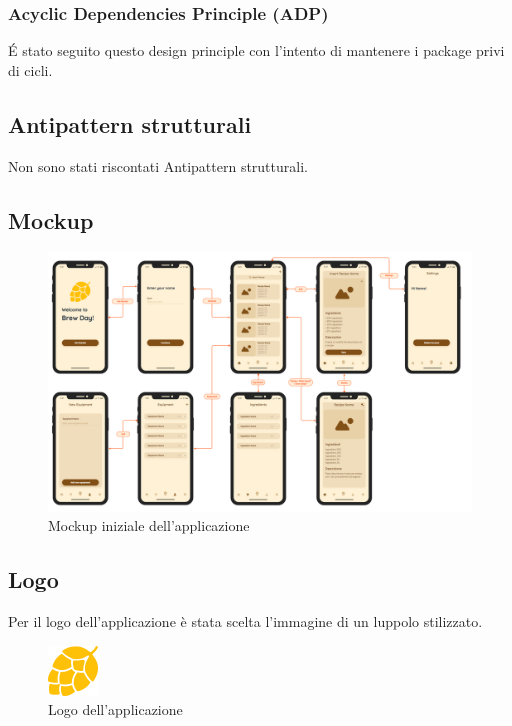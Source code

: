 \documentclass[12pt]{article}
\begin{document}
\subsubsection{Acyclic Dependencies Principle (ADP)}
É stato seguito questo design principle con l'intento di mantenere i package privi di cicli.
 

\subsection{Antipattern strutturali}
Non sono stati riscontati Antipattern strutturali.


\subsection{Mockup}
\begin{figure}[H]
\centering
\includegraphics[width=450px]{mockup.png}
\caption{\label{fig:mockup}Mockup iniziale dell'applicazione}
\end{figure}


\subsection{Logo}
Per il logo dell'applicazione è stata scelta l'immagine di un luppolo stilizzato.
\begin{figure}[H]
\centering
\includegraphics[width=50px]{logo.png}
\caption{\label{fig:logo}Logo dell'applicazione}
\end{figure}
\end{document}
